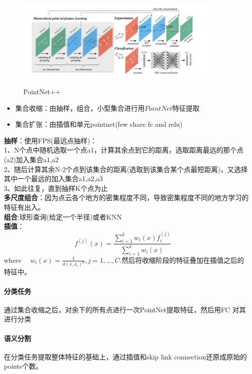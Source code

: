 \documentclass[a4paper,12pt]{article}
\begin{document}
	\begin{figure}[H]
	\begin{center}
		\includegraphics[width=0.9\textwidth]{img/PointNet++.png} 
		\caption{PointNet++}
	\end{center}
\end{figure}


\begin{itemize}
	\item 集合收缩：由抽样，组合，小型集合进行用$PointNet$特征提取
	\item  集合扩张：由插值和单元pointnet(few share fc and relu)
\end{itemize}
\textbf{抽样}：使用FPS(最远点抽样)：\\
1、N个点中随机选取一个点a1，计算其余点到它的距离，选取距离最远的那个点(a2)加入集合{a1,a2}\\
2、随后计算其余N-2个点到该集合的距离(选取到该集合某个点最短距离)，又选择其中一个最远的加入集合{a1,a2,a3}\\
3、如此往复，直到抽样K个点为止
\\
\textbf{多尺度组合}：因为点云各个地方的密集程度不同，导致密集程度不同的地方学习的特征有出入。\\
\textbf{组合}:球形查询(给定一个半径)或者KNN
\\
\textbf{插值}：
$$f^{(j)}(x)=\frac{\sum_{i=1}^{k} w_{i}(x) f_{i}^{(j)}}{\sum_{i=1}^{k} w_{i}(x)} \quad$$ where $\quad w_{i}(x)=\frac{1}{d\left(x, x_{i}\right)^{p}}, j=1, \ldots, C$.然后将收缩阶段的特征叠加在插值之后的特征中。
\paragraph{分类任务}
通过集合收缩之后，对余下的所有点进行一次PointNet提取特征，然后用FC 对其进行分类
\paragraph{语义分割} 在分类任务提取整体特征的基础上，通过插值和skip link connection还原成原始的points个数。
\end{document}
